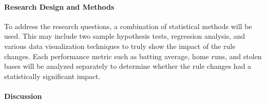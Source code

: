 \documentclass[12pt]{article}
\begin{document}
\paragraph{Research Design and Methods}
To address the research questions, a combination of statistical methods will be
used. This may include two sample hypothesis tests, regression analysis, and
various data visualization techniques to truly show the impact of the rule
changes. Each performance metric such as batting average, home runs, and stolen
bases will be analyzed separately to determine whether the rule changes had a
statistically significant impact.


\paragraph{Discussion}





\end{document}
